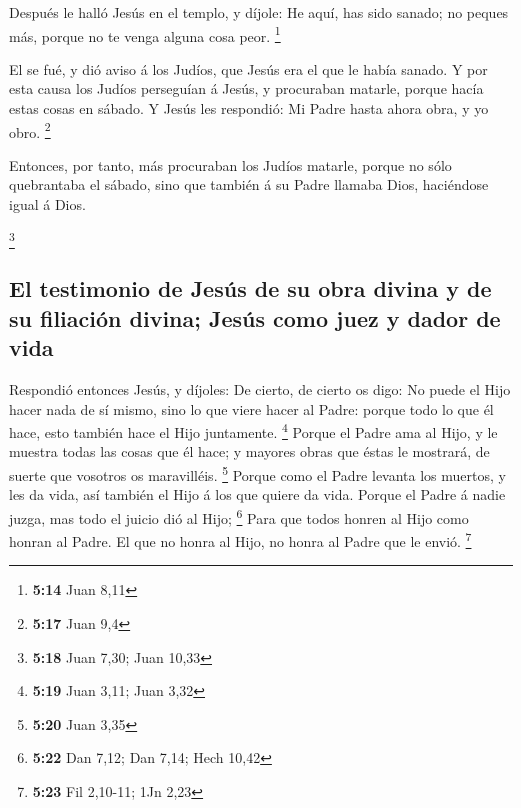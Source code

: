  Después le halló Jesús en el templo, y díjole: He aquí,
has sido sanado; no peques más, porque no te venga alguna cosa peor.
\footnote{\textbf{5:14} Juan 8,11}

 El se fué, y dió aviso á los Judíos, que Jesús era el
que le había sanado.  Y por esta causa los Judíos
perseguían á Jesús, y procuraban matarle, porque hacía estas cosas en
sábado.  Y Jesús les respondió: Mi Padre hasta ahora
obra, y yo obro. \footnote{\textbf{5:17} Juan 9,4}

 Entonces, por tanto, más procuraban los Judíos matarle,
porque no sólo quebrantaba el sábado, sino que también á su Padre
llamaba Dios, haciéndose igual á Dios.

\footnote{\textbf{5:18} Juan 7,30; Juan 10,33}

\hypertarget{el-testimonio-de-jesuxfas-de-su-obra-divina-y-de-su-filiaciuxf3n-divina-jesuxfas-como-juez-y-dador-de-vida}{%
\subsection{El testimonio de Jesús de su obra divina y de su filiación
divina; Jesús como juez y dador de
vida}\label{el-testimonio-de-jesuxfas-de-su-obra-divina-y-de-su-filiaciuxf3n-divina-jesuxfas-como-juez-y-dador-de-vida}}

 Respondió entonces Jesús, y díjoles: De cierto, de
cierto os digo: No puede el Hijo hacer nada de sí mismo, sino lo que
viere hacer al Padre: porque todo lo que él hace, esto también hace el
Hijo juntamente. \footnote{\textbf{5:19} Juan 3,11; Juan 3,32}
 Porque el Padre ama al Hijo, y le muestra todas las
cosas que él hace; y mayores obras que éstas le mostrará, de suerte que
vosotros os maravilléis. \footnote{\textbf{5:20} Juan 3,35}
 Porque como el Padre levanta los muertos, y les da vida,
así también el Hijo á los que quiere da vida.  Porque el
Padre á nadie juzga, mas todo el juicio dió al Hijo; \footnote{\textbf{5:22}
  Dan 7,12; Dan 7,14; Hech 10,42}  Para que todos honren
al Hijo como honran al Padre. El que no honra al Hijo, no honra al Padre
que le envió. \footnote{\textbf{5:23} Fil 2,10-11; 1Jn 2,23}

